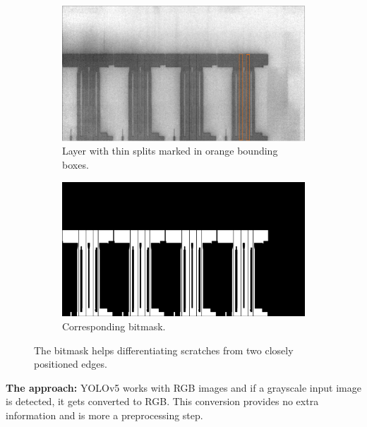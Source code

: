 \begin{figure}[ht]
  \centering

  \begin{subfigure}{0.75\textwidth}
    \includegraphics[width=\textwidth]{images/layer_01486_marked}
    \caption{Layer with thin splits marked in orange bounding boxes.}

  \end{subfigure}

  \begin{subfigure}{0.75\textwidth}
    \includegraphics[width=\textwidth]{images/bitmask_01486}
    \caption{Corresponding bitmask.}
  \end{subfigure}

  \caption{The bitmask helps differentiating scratches from two closely positioned edges.}
  \label{fig:thin_splits}

\end{figure}
\textbf{The approach:}
YOLOv5 works with RGB images and if a grayscale input image is detected, it gets converted to RGB. This conversion provides no extra information and is more a preprocessing step.\\

